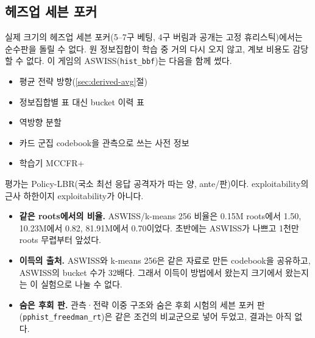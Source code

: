 \subsection{헤즈업 세븐 포커}\label{sec:derived-7stud}
실제 크기의 헤즈업 세븐 포커(5–7구 베팅, 4구 버림과 공개는 고정 휴리스틱)에서는 순수판을 돌릴 수 없다. 원 정보집합이 학습 중 거의 다시 오지 않고, 계보 비용도 감당할 수 없다.
이 게임의 ASWISS(\texttt{hist\_bbf})는 다음을 함께 썼다.
\begin{itemize}
  \item 평균 전략 방향(\ref{sec:derived-avg}절)
  \item 정보집합별 표 대신 bucket 이력 표
  \item 역방향 분할
  \item 카드 군집 codebook을 관측으로 쓰는 사전 정보
  \item 학습기 MCCFR+
\end{itemize}
평가는 Policy-LBR(국소 최선 응답 공격자가 따는 양, ante/판)이다. exploitability의 근사 하한이지 exploitability가 아니다.
\begin{table}[h]
\centering\small
\caption{세븐 포커, 같은 학습 CPU 24시간(스레드 하나, seed 1, 평균 정책, 64파티클, 같은 20,000쌍 deal, 95\%)}\label{tab:7stud}
\end{table}
\begin{itemize}
  \item \textbf{같은 roots에서의 비율.} ASWISS/k-means 256 비율은 0.15M roots에서 1.50, 10.23M에서 0.82, 81.91M에서 0.70이었다. 초반에는 ASWISS가 나쁘고 1천만 roots 무렵부터 앞섰다.
  \item \textbf{이득의 출처.} ASWISS와 k-means 256은 같은 자료로 만든 codebook을 공유하고, ASWISS의 bucket 수가 32배다. 그래서 이득이 방법에서 왔는지 크기에서 왔는지는 이 실험으로 나눌 수 없다.
  \item \textbf{숨은 후회 판.} 관측·전략 이중 구조와 숨은 후회 시험의 세븐 포커 판(\texttt{pphist\_freedman\_rt})은 같은 조건의 비교군으로 넣어 두었고, 결과는 아직 없다.
\end{itemize}
